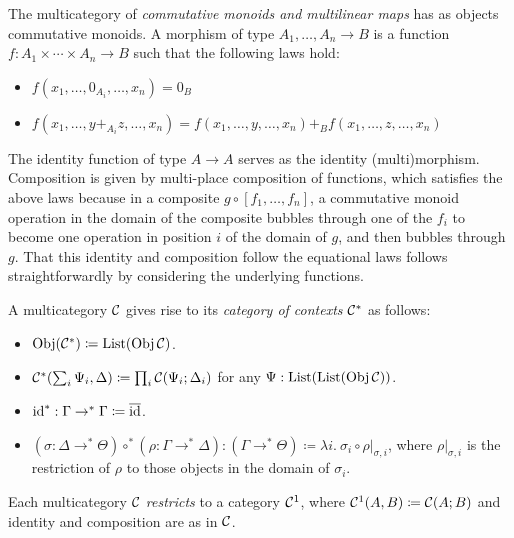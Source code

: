 \begin{example}
  The multicategory of \emph{commutative monoids and multilinear maps} has as
  objects commutative monoids.
  A morphism of type $A_1, \ldots, A_n \to B$ is a function
  $f : A_1 \times \cdots \times A_n \to B$ such that the following laws hold:
  \begin{itemize}
    \item $f(x_1, \ldots, 0_{A_i}, \ldots, x_n) = 0_B$
    \item $f(x_1, \ldots, y +_{A_i} z, \ldots, x_n) =
      f(x_1, \ldots, y, \ldots, x_n) +_B f(x_1, \ldots, z, \ldots, x_n)$
  \end{itemize}
  The identity function of type $A \to A$ serves as the identity
  (multi)morphism.
  Composition is given by multi-place composition of functions, which satisfies
  the above laws because in a composite $g \circ [f_1, \ldots, f_n]$, a
  commutative monoid operation in the domain of the composite bubbles through
  one of the $f_i$ to become one operation in position $i$ of the domain of $g$,
  and then bubbles through $g$.
  That this identity and composition follow the equational laws follows
  straightforwardly by considering the underlying functions.
\end{example}

\begin{definition}
  A multicategory $\mathcal C$ gives rise to its \emph{category of contexts} $\mathcal C^*$ as
  follows:
  \begin{itemize}
    \item $\operatorname{Obj}(\mathcal C^*) \coloneqq \operatorname{List}(\operatorname{Obj}\mathcal C)$.
    \item $\C^*\plr{\sum_i \Psi_i, \Delta} \coloneqq \prod_i \C(\Psi_i; \Delta_i)$
      for any $\Psi : \operatorname{List}(\operatorname{List}(\operatorname{Obj}\mathcal C))$.
    \item $\operatorname{id}^* : \Gamma \to^* \Gamma \coloneqq \overline{\operatorname{id}}$.
    \item $(\sigma : \Delta \to^* \Theta) \circ^* (\rho : \Gamma \to^* \Delta) :
      (\Gamma \to^* \Theta) \coloneqq \lambda i.~\sigma_i \circ \rho|_{\sigma,i}$,
      where $\rho|_{\sigma,i}$ is the restriction of $\rho$ to those objects
      in the domain of $\sigma_i$.
  \end{itemize}
\end{definition}

\begin{definition}
  Each multicategory $\mathcal C$ \emph{restricts} to a category $\mathcal C^1$, where
  $\mathcal C^1(A, B) \coloneqq \mathcal C(A; B)$ and identity and composition are as in $\mathcal C$.
\end{definition}

